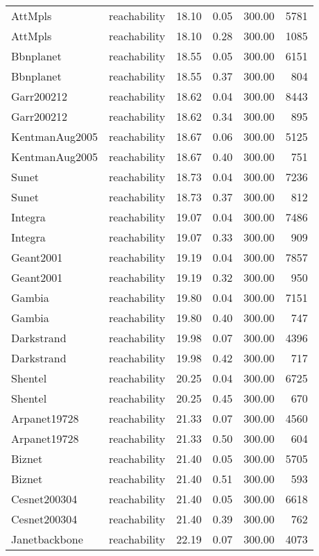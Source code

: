 \begin{tabular}{llrrrr}
AttMpls & reachability & 18.10 & 0.05 & 300.00 & 5781 \\
AttMpls & reachability & 18.10 & 0.28 & 300.00 & 1085 \\
Bbnplanet & reachability & 18.55 & 0.05 & 300.00 & 6151 \\
Bbnplanet & reachability & 18.55 & 0.37 & 300.00 & 804 \\
Garr200212 & reachability & 18.62 & 0.04 & 300.00 & 8443 \\
Garr200212 & reachability & 18.62 & 0.34 & 300.00 & 895 \\
KentmanAug2005 & reachability & 18.67 & 0.06 & 300.00 & 5125 \\
KentmanAug2005 & reachability & 18.67 & 0.40 & 300.00 & 751 \\
Sunet & reachability & 18.73 & 0.04 & 300.00 & 7236 \\
Sunet & reachability & 18.73 & 0.37 & 300.00 & 812 \\
Integra & reachability & 19.07 & 0.04 & 300.00 & 7486 \\
Integra & reachability & 19.07 & 0.33 & 300.00 & 909 \\
Geant2001 & reachability & 19.19 & 0.04 & 300.00 & 7857 \\
Geant2001 & reachability & 19.19 & 0.32 & 300.00 & 950 \\
Gambia & reachability & 19.80 & 0.04 & 300.00 & 7151 \\
Gambia & reachability & 19.80 & 0.40 & 300.00 & 747 \\
Darkstrand & reachability & 19.98 & 0.07 & 300.00 & 4396 \\
Darkstrand & reachability & 19.98 & 0.42 & 300.00 & 717 \\
Shentel & reachability & 20.25 & 0.04 & 300.00 & 6725 \\
Shentel & reachability & 20.25 & 0.45 & 300.00 & 670 \\
Arpanet19728 & reachability & 21.33 & 0.07 & 300.00 & 4560 \\
Arpanet19728 & reachability & 21.33 & 0.50 & 300.00 & 604 \\
Biznet & reachability & 21.40 & 0.05 & 300.00 & 5705 \\
Biznet & reachability & 21.40 & 0.51 & 300.00 & 593 \\
Cesnet200304 & reachability & 21.40 & 0.05 & 300.00 & 6618 \\
Cesnet200304 & reachability & 21.40 & 0.39 & 300.00 & 762 \\
Janetbackbone & reachability & 22.19 & 0.07 & 300.00 & 4073 \\

\end{tabular}

